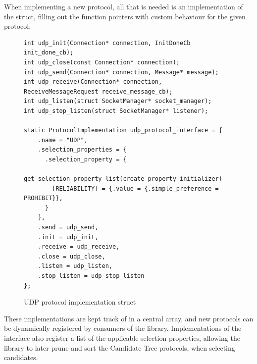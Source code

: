 When implementing a new protocol, all that is needed is an
implementation of the struct, filling out the function pointers
with custom behaviour for the given protocol:

\begin{figure}[H]
\begin{verbatim}
int udp_init(Connection* connection, InitDoneCb init_done_cb);
int udp_close(const Connection* connection);
int udp_send(Connection* connection, Message* message);
int udp_receive(Connection* connection, ReceiveMessageRequest receive_message_cb);
int udp_listen(struct SocketManager* socket_manager);
int udp_stop_listen(struct SocketManager* listener);

static ProtocolImplementation udp_protocol_interface = {
    .name = "UDP",
    .selection_properties = {
      .selection_property = {
        get_selection_property_list(create_property_initializer)
        [RELIABILITY] = {.value = {.simple_preference = PROHIBIT}},
      }
    },
    .send = udp_send,
    .init = udp_init,
    .receive = udp_receive,
    .close = udp_close,
    .listen = udp_listen,
    .stop_listen = udp_stop_listen
};
\end{verbatim}
\caption{UDP protocol implementation struct}
\end{figure} 
 
These implementations are kept track of in a central array,
and new protocols can be dynamically registered by consumers
of the library. Implementations of the interface also register
a list of the applicable selection properties, allowing the library
to later prune and sort the Candidate Tree protocols, when selecting
candidates.
